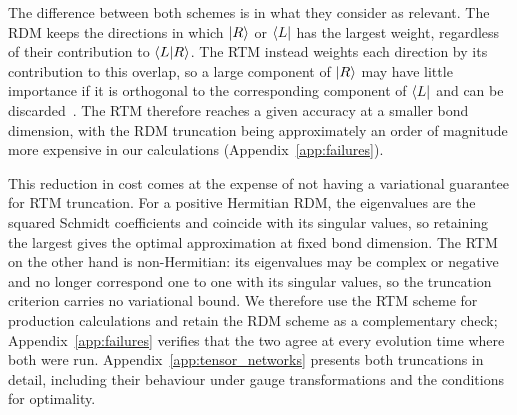 The difference between both schemes is in what they consider as relevant. The \ac{RDM} keeps the directions in which $\ket{R}$ or $\bra{L}$ has the largest weight, regardless of their contribution to $\braket{L}{R}$. The \ac{RTM} instead weights each direction by its contribution to this overlap, so a large component of $\ket{R}$ may have little importance if it is orthogonal to the corresponding component of $\bra{L}$ and can be discarded~\cite{carignano_marimon_tagliacozzo2024,tang2025}. The \ac{RTM} therefore reaches a given accuracy at a smaller bond dimension, with the \ac{RDM} truncation being approximately an order of magnitude more expensive in our calculations (Appendix~\ref{app:failures}).

This reduction in cost comes at the expense of not having a variational guarantee for \ac{RTM} truncation. For a positive Hermitian \ac{RDM}, the eigenvalues are the squared Schmidt coefficients and coincide with its singular values, so retaining the largest gives the optimal approximation at fixed bond dimension. The \ac{RTM} on the other hand is non-Hermitian: its eigenvalues may be complex or negative and no longer correspond one to one with its singular values, so the truncation criterion carries no variational bound. We therefore use the \ac{RTM} scheme for production calculations and retain the \ac{RDM} scheme as a complementary check; Appendix~\ref{app:failures} verifies that the two agree at every evolution time where both were run. Appendix~\ref{app:tensor_networks} presents both truncations in detail, including their behaviour under gauge transformations and the conditions for optimality.